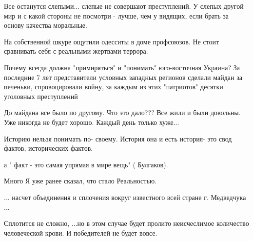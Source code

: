 \begin{itemize}

Все останутся слепыми... слепые не совершают преступлений. У слепых другой мир
и с какой стороны не посмотри - лучше, чем у видящих, если брать за основу
качества моральные.


На собственной шкуре ощутили одесситы в доме профсоюзов. Не стоит сравнивать
себя с реальными жертвами террора.


Почему всегда должна "примиряться" и "понимать" юго-восточная Украина? За
последние 7 лет представители условных западных регионов сделали майдан за
печеньки, спровоцировали войну, за каждым из этих "патриотов" десятки уголовных
преступлений


 
До майдана все было по другому. Что это дало??? Все жили и были довольны. Уже никогда не будет хорошо. Каждый день только хуже...


 

Историю нельзя понимать по- своему. История она и есть история- это свод фактов, исторических фактов.

а " факт - это самая упрямая в мире вещь" ( Булгаков).


 

Много Я уже ранее сказал, что стало Реальностью.

... насчет объединения и сплочения вокруг известного всей стране г. Медведчука
...

Сплотится не сложно, ...но в этом случае будет пролито неисчеслимое количество
человеческой крови. И победителей не будет вовсе.

\end{itemize}

